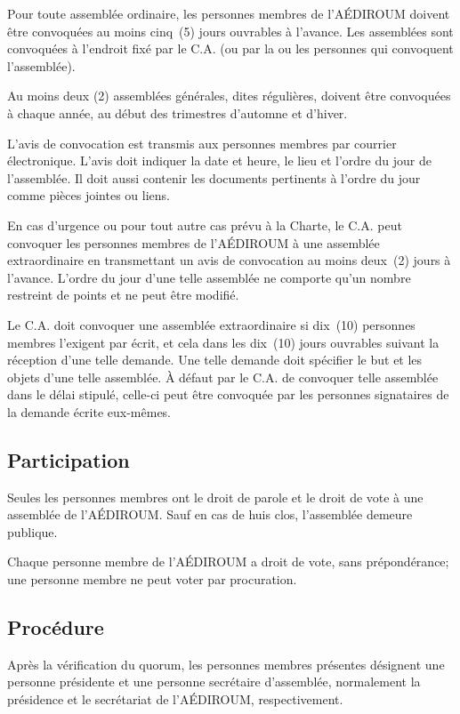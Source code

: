 \documentclass{aediroum}
\begin{document}
Pour toute assemblée ordinaire, les personnes membres de l'AÉDIROUM doivent être convoquées au moins cinq~(5) jours ouvrables à l'avance. Les assemblées sont convoquées à l'endroit fixé par le C.A. (ou par la ou les personnes qui convoquent l'assemblée).

Au moins deux (2) assemblées générales, dites régulières, doivent être convoquées à chaque année, au début des trimestres d'automne et d'hiver.

L'avis de convocation est transmis aux personnes membres par courrier électronique. L'avis doit indiquer la date et heure, le lieu et l'ordre du jour de l'assemblée. Il doit aussi contenir les documents pertinents à l'ordre du jour comme pièces jointes ou liens.

En cas d'urgence ou pour tout autre cas prévu à la Charte, le C.A. peut convoquer les personnes membres de l'AÉDIROUM à une assemblée extraordinaire en transmettant un avis de convocation au moins deux~(2) jours à l'avance. L'ordre du jour d'une telle assemblée ne comporte qu'un nombre restreint de points et ne peut être modifié.

Le C.A. doit convoquer une assemblée extraordinaire si dix~(10) personnes membres l'exigent par écrit, et cela dans les dix~(10) jours ouvrables suivant la réception d'une telle demande. Une telle demande doit spécifier le but et les objets d'une telle assemblée. À défaut par le C.A. de convoquer telle assemblée dans le délai stipulé, celle-ci peut être convoquée par les personnes signataires de la demande écrite eux-mêmes.

\subsection{Participation}\label{sec:participation}

Seules les personnes membres ont le droit de parole et le droit de vote à une assemblée de l'AÉDIROUM. Sauf en cas de huis clos, l'assemblée demeure publique.

Chaque personne membre de l'AÉDIROUM a droit de vote, sans prépondérance; une personne membre ne peut voter par procuration.

\subsection{Procédure}\label{sec:procedure-generale}

Après la vérification du quorum, les personnes membres présentes désignent une personne présidente et une personne secrétaire d'assemblée, normalement la présidence et le secrétariat de l'AÉDIROUM, respectivement.
\end{document}
